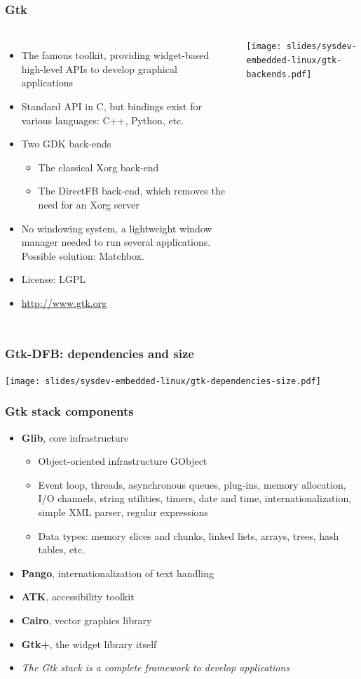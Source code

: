 \begin{frame}
  \frametitle{Gtk}
  \begin{columns}
    \begin{itemize}
    \item The famous toolkit, providing widget-based high-level APIs to
      develop graphical applications
    \item Standard API in C, but bindings exist for various languages:
      C++, Python, etc.
    \item Two GDK back-ends
      \begin{itemize}
      \item The classical Xorg back-end
      \item The DirectFB back-end, which removes the need for an Xorg
        server
      \end{itemize}
    \item No windowing system, a lightweight window manager needed to
      run several applications. Possible solution: Matchbox.
    \item License: LGPL
    \item \url{http://www.gtk.org}
    \end{itemize}
    \texttt{[image: slides/sysdev-embedded-linux/gtk-backends.pdf]}
  \end{columns}
\end{frame}

\begin{frame}
  \frametitle{Gtk-DFB: dependencies and size}
  \begin{center}
    \texttt{[image: slides/sysdev-embedded-linux/gtk-dependencies-size.pdf]}
  \end{center}
\end{frame}

\begin{frame}
  \frametitle{Gtk stack components}
  \begin{itemize}
  \item {\bf Glib}, core infrastructure
    \begin{itemize}
    \item Object-oriented infrastructure GObject
    \item Event loop, threads, asynchronous queues, plug-ins, memory
      allocation, I/O channels, string utilities, timers, date and
      time, internationalization, simple XML parser, regular
      expressions
    \item Data types: memory slices and chunks, linked lists, arrays,
      trees, hash tables, etc.
    \end{itemize}
  \item {\bf Pango}, internationalization of text handling
  \item {\bf ATK}, accessibility toolkit
  \item {\bf Cairo}, vector graphics library
  \item {\bf Gtk+}, the widget library itself
  \item {\em The Gtk stack is a complete framework to develop applications}
  \end{itemize}
\end{frame}

